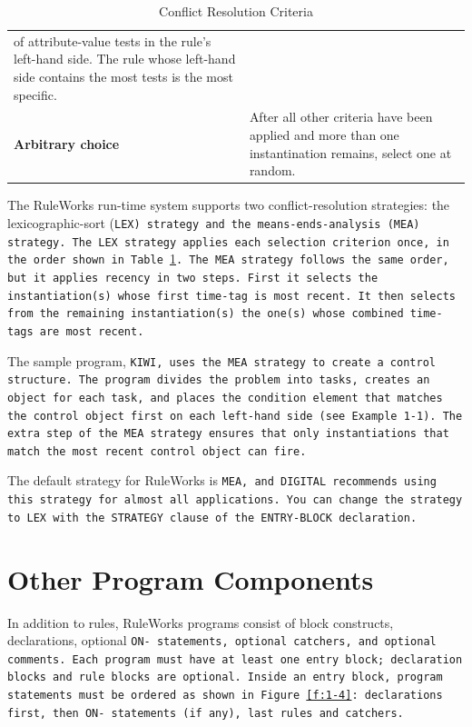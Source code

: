 \begin{table}[h]
\begin{tabularx}{\columnwidth}{lX}
                                of attribute-value tests 
                                in the rule's left-hand  
                                side. The rule whose     
                                left-hand side contains 
                                the most tests is the    
                                most specific. \\
    \textbf{Arbitrary choice} &  After all other criteria 
                                have been applied and   
                                more than one            
                                instantination remains,  
                                select one at random. \\
    \bottomrule
  \end{tabularx}
  \caption{Conflict Resolution Criteria}
  \label{t:crc}
\end{table}

The RuleWorks run-time system supports two conflict-resolution
strategies: the lexicographic-sort (\tt{LEX}) strategy and the
means-ends-analysis (\tt{MEA}) strategy. The \tt{LEX} strategy applies
each selection criterion once, in the order shown in
Table~\ref{t:crc}. The \tt{MEA} strategy follows the same order, but
it applies recency in two steps. First it selects the instantiation(s)
whose first time-tag is most recent. It then selects from the
remaining instantiation(s) the one(s) whose combined time-tags are
most recent.

The sample program, \tt{KIWI}, uses the \tt{MEA} strategy to create a
control structure. The program divides the problem into tasks, creates
an object for each task, and places the condition element that matches
the control object first on each left-hand side (see Example 1-1). The
extra step of the \tt{MEA} strategy ensures that only instantiations
that match the most recent control object can fire.

The default strategy for RuleWorks is \tt{MEA}, and DIGITAL recommends
using this strategy for almost all applications. You can change the
strategy to \tt{LEX} with the \tt{STRATEGY} clause of the
\tt{ENTRY-BLOCK} declaration.

\section{Other Program Components}

In addition to rules, RuleWorks programs consist of block constructs,
declarations, optional \tt{ON-} statements, optional catchers, and
optional comments. Each program must have at least one entry block;
declaration blocks and rule blocks are optional. Inside an entry
block, program statements must be ordered as shown in
Figure~\ref{f:1-4}: declarations first, then \tt{ON-} statements (if
any), last rules and catchers.

